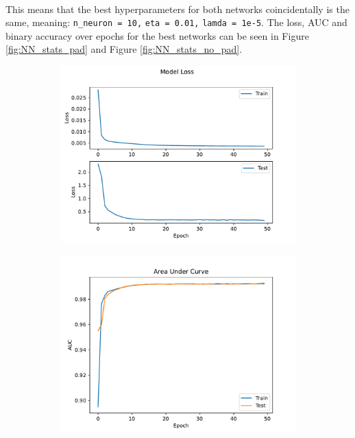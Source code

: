 \documentclass[12pt, a4paper]{book}
\begin{document}
\\This means that the best hyperparameters for both networks coincidentally is the same, meaning: \verb|n_neuron = 10,| \verb|eta = 0.01,| \verb|lamda = 1e-5|. The loss, AUC and binary accuracy over epochs for the best networks can be seen in Figure \ref{fig:NN_stats_pad} and Figure \ref{fig:NN_stats_no_pad}.
\begin{figure}[!ht]
	\centering
	\begin{subfigure}[b]{0.49\textwidth}
      \centering
      \includegraphics[width=1\textwidth]{New_pad/Loss.pdf}
   \end{subfigure}
   \hfill
	\begin{subfigure}[b]{0.49\textwidth}
      \centering
      \includegraphics[width=1\textwidth]{New_pad/AUC.pdf}

\end{subfigure}
\end{figure}
\end{document}
